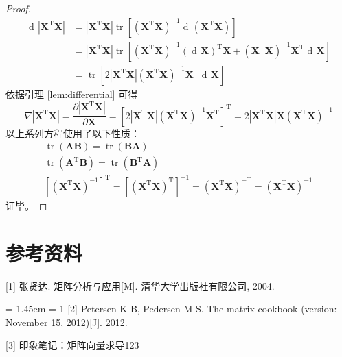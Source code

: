 \documentclass[UTF8,space=auto]{ctexart} %
\DeclareMathOperator{\diff}{d\!}
\begin{document}
\begin{proof}
\begin{align*}
	\diff \left| \mathbf{X}^{\mathrm{T}}\mathbf{X} \right|
	&= \left| \mathbf{X}^{\mathrm{T}}\mathbf{X} \right| \operatorname{tr} \left[ \left( \mathbf{X}^{\mathrm{T}}\mathbf{X} \right)^{-1} \diff\left( \mathbf{X}^{\mathrm{T}}\mathbf{X} \right) \right] \\
	&= \left| \mathbf{X}^{\mathrm{T}}\mathbf{X} \right| \operatorname{tr} \left[ \left( \mathbf{X}^{\mathrm{T}}\mathbf{X} \right)^{-1} \left(\diff\mathbf{X}\right)^{\mathrm{T}} \mathbf{X} + \left( \mathbf{X}^{\mathrm{T}}\mathbf{X} \right)^{-1} \mathbf{X}^{\mathrm{T}} \diff\mathbf{X} \right] \\
	&= \operatorname{tr} \left[ 2\left| \mathbf{X}^{\mathrm{T}}\mathbf{X} \right| \left( \mathbf{X}^{\mathrm{T}}\mathbf{X} \right)^{-1} \mathbf{X}^{\mathrm{T}} \diff\mathbf{X} \right]
\end{align*}
依据引理 \ref{lem:differential} 可得
\[
\nabla \left| \mathbf{X}^{\mathrm{T}}\mathbf{X} \right|
= \frac{\partial\left|\mathbf{X}^{\mathrm{T}} \mathbf{X}\right|}{\partial \mathbf{X}}
= \left[ 2\left| \mathbf{X}^{\mathrm{T}}\mathbf{X} \right| \left( \mathbf{X}^{\mathrm{T}}\mathbf{X} \right)^{-1} \mathbf{X}^{\mathrm{T}} \right]^{\mathrm{T}}
=2\left|\mathbf{X}^{\mathrm{T}} \mathbf{X}\right| \mathbf{X}\left(\mathbf{X}^{\mathrm{T}} \mathbf{X}\right)^{-1}
\]
以上系列方程使用了以下性质：
\begin{gather*}
\operatorname{tr}(\mathbf{AB})=\operatorname{tr}(\mathbf{BA}) \\
\operatorname{tr}\left(\mathbf{A}^{\mathrm{T}} \mathbf{B}\right)=\operatorname{tr}\left(\mathbf{B}^{\mathrm{T}} \mathbf{A}\right) \\
\left[\left( \mathbf{X}^{\mathrm{T}}\mathbf{X} \right)^{-1}\right]^{\mathrm{T}}=\left[\left(\mathbf{X}^{\mathrm{T}}\mathbf{X}\right)^{\mathrm{T}}\right]^{-1}= \left(\mathbf{X}^{\mathrm{T}}\mathbf{X}\right)^{-\mathrm{T}} =\left(\mathbf{X}^{\mathrm{T}}\mathbf{X}\right)^{-1}
\end{gather*}
证毕。
\end{proof}


\section{参考资料}
\setlength{\parindent}{0em}
[1] 张贤达. 矩阵分析与应用[M]. 清华大学出版社有限公司, 2004.

\hangindent = 1.45em \hangafter = 1
[2] Petersen K B, Pedersen M S. The matrix cookbook (version: November 15, 2012)[J]. 2012.

[3] 印象笔记：矩阵向量求导123
\end{document}
